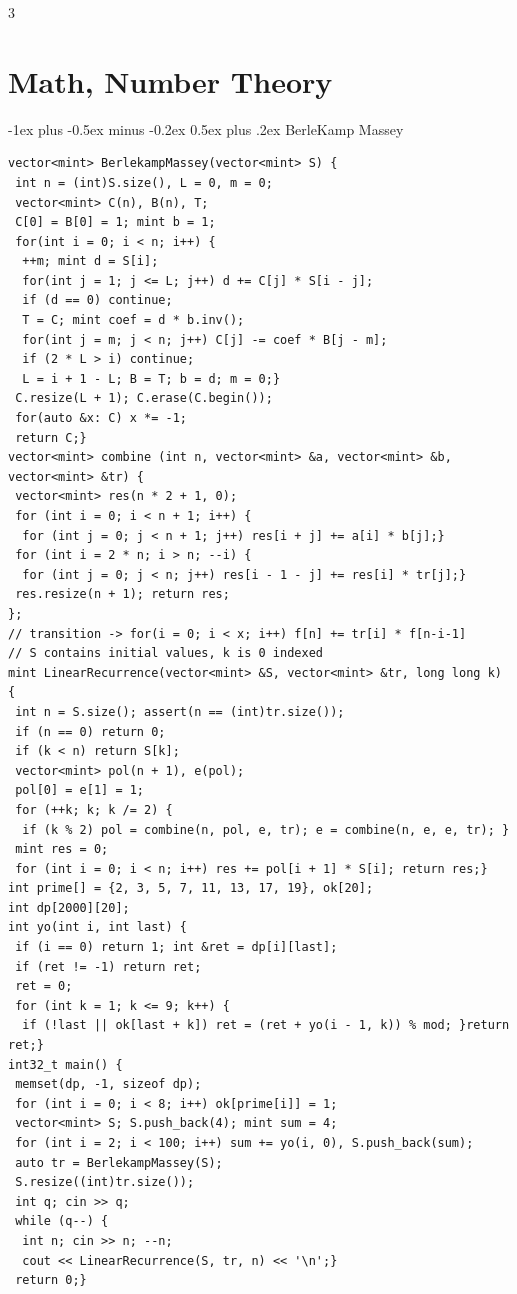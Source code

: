 \documentclass[8pt,a4paper,onesided]{article}
\makeatletter
\renewcommand{\subsection}{\@startsection{subsection}{2}{0mm}
    {-1ex plus -0.5ex minus -0.2ex} %
    {0.5ex plus .2ex}                %
    {\normalfont\large\bfseries}}    %
\makeatother
\begin{document}
\begin{multicols}{3}
\section{Math, Number Theory}
\subsection{BerleKamp Massey}
\begin{verbatim}
vector<mint> BerlekampMassey(vector<mint> S) {
 int n = (int)S.size(), L = 0, m = 0;
 vector<mint> C(n), B(n), T;
 C[0] = B[0] = 1; mint b = 1;
 for(int i = 0; i < n; i++) {
  ++m; mint d = S[i];
  for(int j = 1; j <= L; j++) d += C[j] * S[i - j];
  if (d == 0) continue;
  T = C; mint coef = d * b.inv();
  for(int j = m; j < n; j++) C[j] -= coef * B[j - m];
  if (2 * L > i) continue;
  L = i + 1 - L; B = T; b = d; m = 0;}
 C.resize(L + 1); C.erase(C.begin());
 for(auto &x: C) x *= -1;
 return C;}
vector<mint> combine (int n, vector<mint> &a, vector<mint> &b, vector<mint> &tr) {
 vector<mint> res(n * 2 + 1, 0);
 for (int i = 0; i < n + 1; i++) {
  for (int j = 0; j < n + 1; j++) res[i + j] += a[i] * b[j];}
 for (int i = 2 * n; i > n; --i) {
  for (int j = 0; j < n; j++) res[i - 1 - j] += res[i] * tr[j];}
 res.resize(n + 1); return res;
};
// transition -> for(i = 0; i < x; i++) f[n] += tr[i] * f[n-i-1]
// S contains initial values, k is 0 indexed
mint LinearRecurrence(vector<mint> &S, vector<mint> &tr, long long k) {
 int n = S.size(); assert(n == (int)tr.size());
 if (n == 0) return 0;
 if (k < n) return S[k];
 vector<mint> pol(n + 1), e(pol);
 pol[0] = e[1] = 1;
 for (++k; k; k /= 2) {
  if (k % 2) pol = combine(n, pol, e, tr); e = combine(n, e, e, tr); }
 mint res = 0;
 for (int i = 0; i < n; i++) res += pol[i + 1] * S[i]; return res;}
int prime[] = {2, 3, 5, 7, 11, 13, 17, 19}, ok[20];
int dp[2000][20];
int yo(int i, int last) {
 if (i == 0) return 1; int &ret = dp[i][last];
 if (ret != -1) return ret;
 ret = 0;
 for (int k = 1; k <= 9; k++) {
  if (!last || ok[last + k]) ret = (ret + yo(i - 1, k)) % mod; }return ret;}
int32_t main() {
 memset(dp, -1, sizeof dp);
 for (int i = 0; i < 8; i++) ok[prime[i]] = 1;
 vector<mint> S; S.push_back(4); mint sum = 4;
 for (int i = 2; i < 100; i++) sum += yo(i, 0), S.push_back(sum);
 auto tr = BerlekampMassey(S);
 S.resize((int)tr.size());
 int q; cin >> q;
 while (q--) {
  int n; cin >> n; --n;
  cout << LinearRecurrence(S, tr, n) << '\n';}
 return 0;}
\end{verbatim}

\end{multicols}
\end{document}
